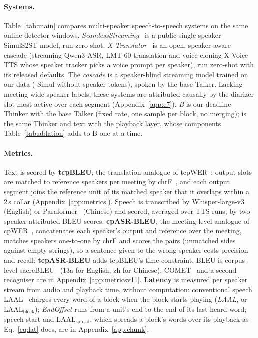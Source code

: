\paragraph{Systems.} Table~\ref{tab:main} compares multi-speaker speech-to-speech systems on the same online detector
windows. \emph{SeamlessStreaming}~\citep{seamless2023} is a public single-speaker SimulS2ST model, run zero-shot.\ifXT{} \emph{X-Translator}~\citep{zhao2026xtranslator} is an open, speaker-aware cascade (streaming
Qwen3-ASR, LMT-60 translation and voice-cloning X-Voice TTS whose speaker tracker picks a voice prompt per speaker), run
zero-shot with its released defaults.\fi\ifCascade{} The \emph{cascade} is a speaker-blind streaming model trained on
our data (\sys{}-Simul without speaker tokens), spoken by the base Talker.\fi{} Lacking meeting-wide speaker labels, these
systems are attributed causally by the diarizer slot most active over each segment (Appendix~\ref{app:e7}). \emph{B} is our deadline Thinker with the
base Talker (fixed rate, one sample per block, no merging); \sys{} is the same Thinker and text with the playback layer,
whose components Table~\ref{tab:ablation} adds to B one at a time.

\paragraph{Metrics.} Text is scored by \textbf{tcpBLEU}, the translation analogue of tcpWER~\citep{neumann2023meeteval}:
output slots are matched to reference speakers per meeting by chrF~\citep{popovic2015chrf}, and each output segment
joins the reference unit of its matched speaker that it overlaps within a 2\,s collar (Appendix~\ref{app:metrics}).
Speech is transcribed by Whisper-large-v3~\citep{radford2023robust} (English) or Paraformer~\citep{gao2022paraformer}
(Chinese) and scored, averaged over TTS runs, by two speaker-attributed BLEU scores: \textbf{cpASR-BLEU}, the
meeting-level analogue of cpWER~\citep{watanabe2020chime6}, concatenates each speaker's output and reference over the
meeting, matches speakers one-to-one by chrF and scores the pairs (unmatched sides against empty strings), so a sentence
given to the wrong speaker costs precision and recall; \textbf{tcpASR-BLEU} adds tcpBLEU's time constraint. BLEU is corpus-level sacreBLEU~\citep{post2018call}
(13a for English, zh for Chinese)\ifMetricsV{}; COMET~\citep{rei2022comet} and a second recogniser are in
Appendix~\ref{app:metricsv11}\fi. \textbf{Latency} is measured per speaker stream from audio and playback time, without
computation: conventional speech LAAL~\citep{papi2022over} charges every word of a block when the block starts playing
(\emph{LAAL}, or LAAL$_\text{block}$); \emph{EndOffset} runs from a unit's end to the end of its last heard word; speech
start and LAAL$_\text{spread}$, which spreads a block's words over its playback as Eq.~\eqref{eq:lat} does, are in
Appendix~\ref{app:chunk}.

